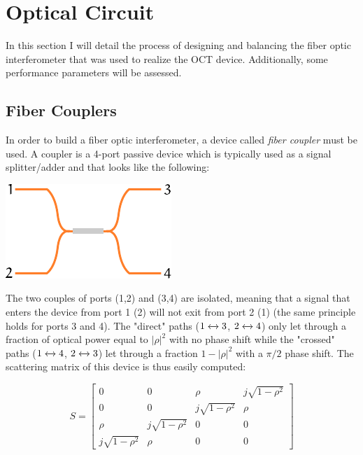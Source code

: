     
   
   
\newpage
\section{Optical Circuit}

In this section I will detail the process of designing and balancing the fiber optic interferometer that was used to realize the OCT device. Additionally, some performance parameters will be assessed. 


\subsection{Fiber Couplers}
In order to build a fiber optic interferometer, a device called \emph{fiber coupler} must be used. A coupler is a 4-port passive device which is typically used as a signal splitter/adder and that looks like the following:

\begin{center}
	{\includegraphics[width=0.35\linewidth]{gfx/ch3/couplers/fiber-coupler.pdf}}
\end{center}



The two couples of ports (1,2) and (3,4) are isolated, meaning that a signal that enters the device from port 1 (2) will not exit from port 2 (1) (the same principle holds for ports 3 and 4).  The "direct" paths ($1\xleftrightarrow{}3 $, $2\xleftrightarrow{} 4$) only let through a fraction of optical power equal to $|\rho|^2$ with no phase shift while the "crossed" paths ($1\xleftrightarrow{}4 $, $2\xleftrightarrow{} 3$) let through a fraction $1-|\rho|^2$ with a $\pi/2$ phase shift. The scattering matrix of this device is thus easily computed:

\begin{equation}
	S = \begin{bmatrix}
	0 & 0 & \rho & j\sqrt{1-\rho^2}\\
	0 & 0 & j\sqrt{1-\rho^2}& \rho \\
	\rho & j\sqrt{1-\rho^2}  & 0 & 0\\
	j\sqrt{1-\rho^2} & \rho  & 0 & 0
\end{bmatrix}
\end{equation}


